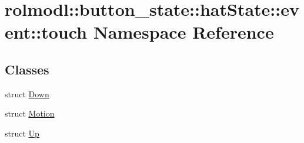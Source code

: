 \hypertarget{namespacerolmodl_1_1button__state_1_1hat_state_1_1event_1_1touch}{}\section{rolmodl\+::button\+\_\+state\+::hat\+State\+::event\+::touch Namespace Reference}
\label{namespacerolmodl_1_1button__state_1_1hat_state_1_1event_1_1touch}
\subsection*{Classes}
\begin{DoxyCompactItemize}
\item 
struct \mbox{\hyperlink{structrolmodl_1_1button__state_1_1hat_state_1_1event_1_1touch_1_1_down}{Down}}
\item 
struct \mbox{\hyperlink{structrolmodl_1_1button__state_1_1hat_state_1_1event_1_1touch_1_1_motion}{Motion}}
\item 
struct \mbox{\hyperlink{structrolmodl_1_1button__state_1_1hat_state_1_1event_1_1touch_1_1_up}{Up}}
\end{DoxyCompactItemize}
